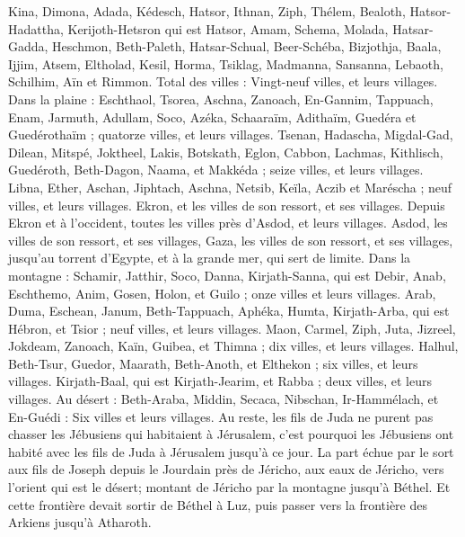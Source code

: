 \begin{multicols}{2}
Kina, Dimona, Adada,
Kédesch, Hatsor, Ithnan,
Ziph, Thélem, Bealoth,
Hatsor-Hadattha, Kerijoth-Hetsron qui est Hatsor,
Amam, Schema, Molada,
Hatsar-Gadda, Heschmon, Beth-Paleth,
Hatsar-Schual, Beer-Schéba, Bizjothja,
Baala, Ijjim, Atsem,
Eltholad, Kesil, Horma,
Tsiklag, Madmanna, Sansanna,
Lebaoth, Schilhim, Aïn et Rimmon. Total des villes : Vingt-neuf villes, et leurs villages.
Dans la plaine : Eschthaol, Tsorea, Aschna,
Zanoach, En-Gannim, Tappuach, Enam,
Jarmuth, Adullam, Soco, Azéka,
Schaaraïm, Adithaïm, Guedéra et Guedérothaïm ; quatorze villes, et leurs villages.
Tsenan, Hadascha, Migdal-Gad,
Dilean, Mitspé, Joktheel,
Lakis, Botskath, Eglon,
Cabbon, Lachmas, Kithlisch,
Guedéroth, Beth-Dagon, Naama, et Makkéda ; seize villes, et leurs villages.
Libna, Ether, Aschan,
Jiphtach, Aschna, Netsib,
Keïla, Aczib et Maréscha ; neuf villes, et leurs villages.
Ekron, et les villes de son ressort, et ses villages.
Depuis Ekron et à l'occident, toutes les villes près d'Asdod, et leurs villages.
Asdod, les villes de son ressort, et ses villages, Gaza, les villes de son ressort, et ses villages, jusqu'au torrent d'Egypte, et à la grande mer, qui sert de limite.
Dans la montagne : Schamir, Jatthir, Soco,
Danna, Kirjath-Sanna, qui est Debir,
Anab, Eschthemo, Anim,
Gosen, Holon, et Guilo ; onze villes et leurs villages.
Arab, Duma, Eschean,
Janum, Beth-Tappuach, Aphéka,
Humta, Kirjath-Arba, qui est Hébron, et Tsior ; neuf villes, et leurs villages.
Maon, Carmel, Ziph, Juta,
Jizreel, Jokdeam, Zanoach,
Kaïn, Guibea, et Thimna ; dix villes, et leurs villages.
Halhul, Beth-Tsur, Guedor,
Maarath, Beth-Anoth, et Elthekon ; six villes, et leurs villages.
Kirjath-Baal, qui est Kirjath-Jearim, et Rabba ; deux villes, et leurs villages.
Au désert : Beth-Araba, Middin, Secaca,
Nibschan, Ir-Hammélach, et En-Guédi : Six villes et leurs villages.
Au reste, les fils de Juda ne purent pas chasser les Jébusiens qui habitaient à Jérusalem, c'est pourquoi les Jébusiens ont habité avec les fils de Juda à Jérusalem jusqu'à ce jour.
\VerseOne{}La part échue par le sort aux fils de Joseph depuis le Jourdain près de Jéricho, aux eaux de Jéricho, vers l'orient qui est le désert; montant de Jéricho par la montagne jusqu'à Béthel.
Et cette frontière devait sortir  de Béthel à Luz, puis passer vers la frontière des Arkiens jusqu'à Atharoth.

\end{multicols}
